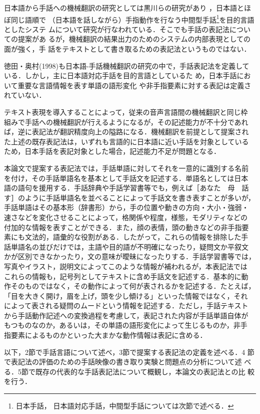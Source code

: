 \renewcommand{\thefootnote}{}
日本語から手話への機械翻訳の研究としては黒川らの研究があり
\cite{Fujishige1997,Ikeda2003,Kawano2004}，日本語とほぼ同じ語順で
（日本語を話しながら）手指動作を行なう中間型手話\footnote{日本手話，
  日本語対応手話，中間型手話については次節で述べる．}を目的言語としたシステ
ムについて研究が行なわれている．そこでも手話の表記法についての提案があ
るが，機械翻訳の結果出力のためのシステムの内部表現としての面が強く，手
話をテキストとして書き取るための表記法というものではない．

徳田・奥村(1998)も日本語-手話機械翻訳の研究の中で，手話表記法を定義して
いる．しかし，主に日本語対応手話\footnotemark[1]を目的言語としているた
め，日本手話\footnotemark[1]において重要な言語情報を表す単語の語形変化
や非手指要素に対する表記は定義されていない．

テキスト表現を導入することによって，従来の音声言語間の機械翻訳と同じ枠
組みで手話への機械翻訳が行えるようになるが，その記述能力が不十分であれ
ば，逆に表記法が翻訳精度向上の隘路になる．機械翻訳を前提として提案され
た上述の既存表記法は，いずれも言語的に日本語に近い手話を対象としている
ため，日本手話を表記対象とした場合，記述能力不足が問題となる．

本論文で提案する表記法では，手話単語に対してそれを一意的に識別する名前
を付け，その手話単語名を基本として手話文を記述する．単語名としては日本
語の語句を援用する．手話辞典や手話学習書等でも，例えば［あなた　母　話
す］のように手話単語名を並べることによって手話文を書き表すことが多いが，
手話単語はその基本形（辞書形）から，手の位置や動きの方向・大小・強弱・
速さなどを変化させることによって，格関係や程度，様態，モダリティなどの
付加的な情報を表すことができる．また，顔の表情，頭の動きなどの非手指要
素にも文法的，語彙的な役割がある．したがって，これらの情報を排除した手
話単語名の並びだけでは，主語や目的語が不明確になったり，疑問文か平叙文
かが区別できなかったり，文の意味が曖昧になったりする．手話学習書等では，
写真やイラスト，説明文によってこのような情報が補われるが，本表記法では
これらの情報も，記号列としてテキストに含め手話文を記述する．基本的に動
作そのものではなく，その動作によって何が表されるかを記述する．たとえば，
「目を大きく開け，眉を上げ，頭を少し傾ける」といった情報ではなく，それ
によって表される疑問のムードという情報を記述する．ただし，手話テキスト
から手話動作記述への変換過程を考慮して，表記された内容が手話単語自体が
もつものなのか，あるいは，その単語の語形変化によって生じるものか，非手
指要素によるものかといった大まかな動作情報は表記に含める．

以下，2節で手話言語について述べ，3節で提案する表記法の定義を述べる．4
節で表記法の評価のための手話映像の書き取り実験と問題点の分析について述
べる．5節で既存の代表的な手話表記法について概観し，本論文の表記法との比
較を行う．


